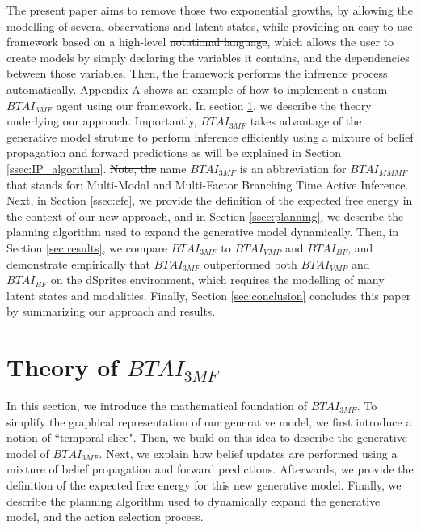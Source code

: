 \documentclass[twoside,11pt]{article}
\providecommand{\DIFadd}[1]{{\protect\color{blue}\uwave{#1}}} %
\providecommand{\DIFdel}[1]{{\protect\color{red}\sout{#1}}}                      %
\providecommand{\DIFaddbegin}{} %
\providecommand{\DIFaddend}{} %
\providecommand{\DIFdelbegin}{} %
\providecommand{\DIFdelend}{} %
\begin{document}
The present paper aims to remove those two exponential growths, by allowing the modelling of several observations and latent states, while providing an easy to use framework based on a high-level \DIFdelbegin \DIFdel{notational language}\DIFdelend \DIFaddbegin \DIFadd{notation}\DIFaddend , which allows the user to create models by simply declaring the variables it contains, and the dependencies between those variables. Then, the framework performs the inference process automatically. Appendix A shows an example of how to implement a custom $BTAI_{3MF}$ agent using our framework. In section \ref{sec:btai_3mf}, we describe the theory underlying our approach. Importantly, $BTAI_{3MF}$ takes advantage of the generative model struture to perform inference efficiently using a mixture of belief propagation \citep{BP_and_DC, believe,belief_propagation} and forward predictions as will be explained in Section \ref{ssec:IP_algorithm}. \DIFdelbegin \DIFdel{Note, the }\DIFdelend \DIFaddbegin \DIFadd{The }\DIFaddend name $BTAI_{3MF}$ is an abbreviation for  $BTAI_{MMMF}$ that stands for: Multi-Modal and Multi-Factor Branching Time Active Inference. Next, in Section \ref{ssec:efe}, we provide the definition of the expected free energy in the context of our new approach, and in Section \ref{ssec:planning}, we describe the planning algorithm used to expand the generative model dynamically. Then, in Section \ref{sec:results}, we compare $BTAI_{3MF}$ to $BTAI_{VMP}$ and $BTAI_{BF}$, and demonstrate empirically that $BTAI_{3MF}$ outperformed both $BTAI_{VMP}$ and $BTAI_{BF}$ on the dSprites environment, which requires the modelling of many latent states and modalities. Finally, Section \ref{sec:conclusion} concludes this paper by summarizing our approach and results.

\section{Theory of $BTAI_{3MF}$} \label{sec:btai_3mf}

In this section, we introduce the mathematical foundation of $BTAI_{3MF}$. To simplify the graphical representation of our generative model, we first introduce a notion of ``temporal slice". Then, we build on this idea to describe the generative model of $BTAI_{3MF}$. Next, we explain how belief updates are performed using a mixture of belief propagation and forward predictions. Afterwards, we provide the definition of the expected free energy for this new generative model. Finally, we describe the planning algorithm used to dynamically expand the generative model, and the action selection process.
\end{document}

